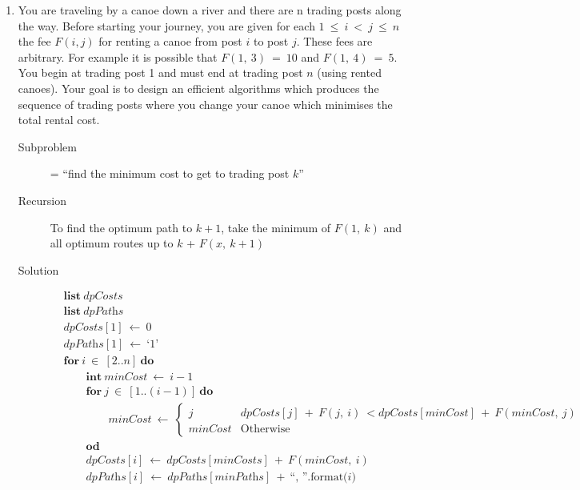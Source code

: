 \documentclass[a4paper]{article}
\begin{document}
\begin{enumerate}
\begin{description}
				\end{description}
				\clearpage		
	\item You are traveling by a canoe down a river and there are n trading posts along the way. Before starting your journey, you are given for each $1\ \leq\ i\ <\ j\ \leq\ n$ the fee $F(i, j)$ for renting a canoe from post $i$ to post $j$. These fees are arbitrary. For example it is possible that $F(1,\ 3)\ =\ 10$ and $F(1,\ 4)\ =\ 5$. You begin at trading post 1 and must end at trading post $n$ (using rented canoes). Your goal is to design an efficient algorithms which produces the sequence of trading posts where you change your canoe which minimises the total rental cost.
			\begin{description}
					\item[Subproblem] = ``find the minimum cost to get to trading post $k$''
					\item[Recursion] To find the optimum path to $k+1$, take the minimum of $F(1,\ k)$ and all optimum routes up to $k$ + $F(x,\ k+1)$
					\item[Solution] %
							\begin{align*}
									&\textbf{list}\ \textit{dpCosts} \\
									&\textbf{list}\ \textit{dpPaths} \\
									&\textit{dpCosts}[1]\ \gets\ 0 \\
									&\textit{dpPaths}[1]\ \gets\ \text{`1'} \\
									&\textbf{for}\ i\ \in\ [2..n]\ \textbf{do} \\
									&\qquad\textbf{int}\ \textit{minCost}\ \gets\ i-1 \\
									&\qquad\textbf{for}\ j\ \in\ [1..(i-1)]\ \textbf{do}\\
									&\qquad\qquad \textit{minCost}\ \gets\ 
									\begin{cases}
											j & \textit{dpCosts}[j]\ +\ F(j,\ i)\ < \textit{dpCosts}[\textit{minCost}]\ +\ F(\textit{minCost},\ j) \\
											\textit{minCost} & \text{Otherwise}
									\end{cases} \\
									&\qquad\textbf{od}\\
									&\qquad\textit{dpCosts}[i]\ \gets\ \textit{dpCosts}[\textit{minCosts}]\ +\ F(\textit{minCost},\ i) \\
									&\qquad\textit{dpPaths}[i]\ \gets\ \textit{dpPaths}[\textit{minPaths}]\ +\ \text{``,\ {}''.format($i$)} \\

\end{align*}
\end{description}
\end{enumerate}
\end{document}

